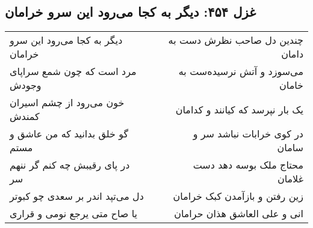 \begin{center}
\section*{غزل ۴۵۴: دیگر به کجا می‌رود این سرو خرامان}
\label{sec:454}
\begin{longtable}{l p{0.5cm} r}
دیگر به کجا می‌رود این سرو خرامان
&&
چندین دل صاحب نظرش دست به دامان
\\
مرد است که چون شمع سراپای وجودش
&&
می‌سوزد و آتش نرسیده‌ست به خامان
\\
خون می‌رود از چشم اسیران کمندش
&&
یک بار نپرسد که کیانند و کدامان
\\
گو خلق بدانید که من عاشق و مستم
&&
در کوی خرابات نباشد سر و سامان
\\
در پای رقیبش چه کنم گر ننهم سر
&&
محتاج ملک بوسه دهد دست غلامان
\\
دل می‌تپد اندر بر سعدی چو کبوتر
&&
زین رفتن و بازآمدن کبک خرامان
\\
یا صاح متی یرجع نومی و قراری
&&
انی و علی العاشق هذان حرامان
\\
\end{longtable}
\end{center}
